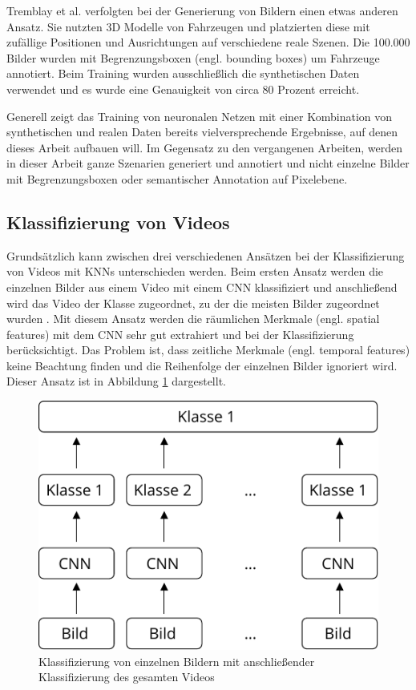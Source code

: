 Tremblay et al. \cite{tremblay2018training} verfolgten bei der Generierung von Bildern einen etwas anderen Ansatz. Sie nutzten 3D Modelle von Fahrzeugen und platzierten diese mit zufällige Positionen und Ausrichtungen auf verschiedene reale Szenen. Die 100.000 Bilder wurden mit Begrenzungsboxen (engl. bounding boxes) um Fahrzeuge annotiert. Beim Training wurden ausschließlich die synthetischen Daten verwendet und es wurde eine Genauigkeit von circa 80 Prozent erreicht.

Generell zeigt das Training von neuronalen Netzen mit einer Kombination von synthetischen und realen Daten bereits vielversprechende Ergebnisse, auf denen dieses Arbeit aufbauen will. Im Gegensatz zu den vergangenen Arbeiten, werden in dieser Arbeit ganze Szenarien generiert und annotiert und nicht einzelne Bilder mit Begrenzungsboxen oder semantischer Annotation auf Pixelebene.


\subsection{Klassifizierung von Videos}
\label{grundlagen_nn_video}

Grundsätzlich kann zwischen drei verschiedenen Ansätzen bei der Klassifizierung von Videos mit \acp{KNN} unterschieden werden. Beim ersten Ansatz werden die einzelnen Bilder aus einem Video mit einem \ac{CNN} klassifiziert und anschließend wird das Video der Klasse zugeordnet, zu der die meisten Bilder zugeordnet wurden \cite{karpathy2014large}. Mit diesem Ansatz werden die räumlichen Merkmale (engl. spatial features) mit dem \ac{CNN} sehr gut extrahiert und bei der Klassifizierung berücksichtigt. Das Problem ist, dass zeitliche Merkmale (engl. temporal features) keine Beachtung finden und die Reihenfolge der einzelnen Bilder ignoriert wird. Dieser Ansatz ist in Abbildung \ref{fig_single_frame_classification} dargestellt.

\begin{figure}[h]
\centering
\includegraphics[scale=0.8]{images/single_frame_classification.pdf}
\caption{Klassifizierung von einzelnen Bildern mit anschließender Klassifizierung des gesamten Videos}
\label{fig_single_frame_classification}
\end{figure}

